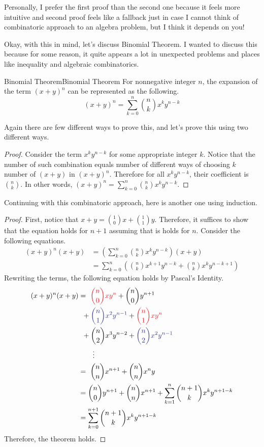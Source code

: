 \documentclass[../../../main.tex]{subfiles}
\begin{document}
Personally, I prefer the first proof than the second one because it
feels more intuitive and second proof feels like a fallback just in
case I cannot think of combinatoric approach to an algebra problem,
but I think it depends on you!

Okay, with this in mind, let's discuss Binomial Theorem. I wanted to
discuss this because for some reason, it quite appears a lot in
unexpected problems and places like inequality and algebraic
combinatorics.

\begin{theorem}{Binomial Theorem}{Binomial Theorem}
For nonnegative integer $n$, the expansion of the term $(x + y)^n$
can be represented as the following.
\[
(x + y)^n = \sum_{k=0}^n \binom{n}{k} x^k y^{n-k}
\]
\end{theorem}

Again there are few different ways to prove this, and let's prove this
using two different ways.

\begin{proof}
Consider the term $x^k y^{n-k}$ for some appropriate integer $k$.
Notice that the number of such combination equals number of different
ways of choosing $k$ number of $(x + y)$ in $(x + y)^n$.
Therefore for all $x^k y^{n-k}$, their coefficient is $\binom{n}{k}$.
In other words, $(x + y)^n = \sum_{k=0}^n \binom{n}{k} x^k y^{n-k}$.
\end{proof}

Continuing with this combinatoric approach, here is another one using
induction.

\begin{proof}
First, notice that $x + y = \binom{1}{0} x + \binom{1}{1} y$.
Therefore, it suffices to show that the equation holds for $n + 1$
assuming that is holds for $n$. Consider the following equations.
\begin{align*}
    (x + y)^n (x + y)
    &= \left( \sum_{k=0}^n \binom{n}{k} x^k y^{n-k} \right) (x + y) \\
    &= \sum_{k=0}^n \left(
        \binom{n}{k} x^{k+1} y^{n-k} + \binom{n}{k} x^k y^{n-k+1}
    \right)
\end{align*}
Rewriting the terms, the following equation holds by Pascal's
Identity.
\begin{align*}
    (x + y)^n (x + y)
    &=\ \textcolor{Red}{\binom{n}{0} xy^n} + \binom{n}{0} y^{n+1} \\
    &\ \,+ \textcolor{Blue}{\binom{n}{1} x^2y^{n-1}} +
        \textcolor{Red}{\binom{n}{1} xy^n} \\
    &\ \,+ \binom{n}{2} x^3y^{n-2} +
        \textcolor{Blue}{\binom{n}{2} x^2y^{n-1}} \\
    &\qquad\vdots \\
    &=\ \binom{n}{n} x^{n+1} + \binom{n}{n} x^ny \\
    &= \binom{n}{0} y^{n+1} + \binom{n}{n} x^{n+1}
        + \sum_{k=1}^{n} \binom{n+1}{k} x^k y^{n+1-k} \\
    &= \sum_{k=0}^{n+1} \binom{n+1}{k} x^k y^{n+1-k}
\end{align*}
Therefore, the theorem holds.
\end{proof}
\end{document}
